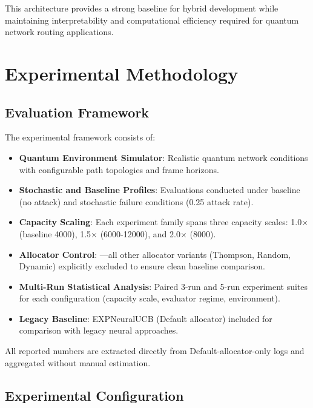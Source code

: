 \documentclass[12pt,a4paper]{article}
\begin{document}
This architecture provides a strong baseline for hybrid development while maintaining interpretability and computational efficiency required for quantum network routing applications.

\section{Experimental Methodology}

\subsection{Evaluation Framework}

The experimental framework consists of:

\begin{itemize}
    \item \textbf{Quantum Environment Simulator}: Realistic quantum network conditions with configurable path topologies and frame horizons.
    \item \textbf{Stochastic and Baseline Profiles}: Evaluations conducted under baseline (no attack) and stochastic failure conditions (0.25 attack rate).
    \item \textbf{Capacity Scaling}: Each experiment family spans three capacity scales: 1.0$\times$ (baseline 4000), 1.5$\times$ (6000-12000), and 2.0$\times$ (8000).
    \item \textbf{Allocator Control}: —all other allocator variants (Thompson, Random, Dynamic) explicitly excluded to ensure clean baseline comparison.
    \item \textbf{Multi-Run Statistical Analysis}: Paired 3-run and 5-run experiment suites for each configuration (capacity scale, evaluator regime, environment).
    \item \textbf{Legacy Baseline}: EXPNeuralUCB (Default allocator) included for comparison with legacy neural approaches.
\end{itemize}

All reported numbers are extracted directly from Default-allocator-only logs and aggregated without manual estimation.

\subsection{Experimental Configuration}
\end{document}
